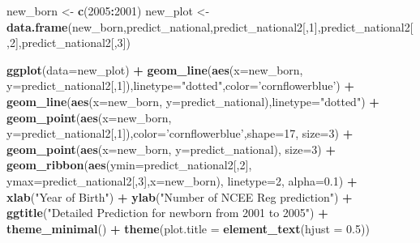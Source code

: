\documentclass[]{article}
\newenvironment{Shaded}{\begin{snugshade}}{\end{snugshade}}
\newcommand{\KeywordTok}[1]{\textcolor[rgb]{0.13,0.29,0.53}{\textbf{#1}}}
\newcommand{\DataTypeTok}[1]{\textcolor[rgb]{0.13,0.29,0.53}{#1}}
\newcommand{\DecValTok}[1]{\textcolor[rgb]{0.00,0.00,0.81}{#1}}
\newcommand{\FloatTok}[1]{\textcolor[rgb]{0.00,0.00,0.81}{#1}}
\newcommand{\StringTok}[1]{\textcolor[rgb]{0.31,0.60,0.02}{#1}}
\newcommand{\OperatorTok}[1]{\textcolor[rgb]{0.81,0.36,0.00}{\textbf{#1}}}
\newcommand{\NormalTok}[1]{#1}
\begin{document}
\begin{Shaded}
\begin{Highlighting}[]
\NormalTok{new_born <-}\StringTok{ }\KeywordTok{c}\NormalTok{(}\DecValTok{2005}\OperatorTok{:}\DecValTok{2001}\NormalTok{)}
\NormalTok{new_plot <-}\StringTok{ }\KeywordTok{data.frame}\NormalTok{(new_born,predict_national,predict_national2[,}\DecValTok{1}\NormalTok{],predict_national2[,}\DecValTok{2}\NormalTok{],predict_national2[,}\DecValTok{3}\NormalTok{])}

\KeywordTok{ggplot}\NormalTok{(}\DataTypeTok{data=}\NormalTok{new_plot) }\OperatorTok{+}
\StringTok{  }\KeywordTok{geom_line}\NormalTok{(}\KeywordTok{aes}\NormalTok{(}\DataTypeTok{x=}\NormalTok{new_born, }\DataTypeTok{y=}\NormalTok{predict_national2[,}\DecValTok{1}\NormalTok{]),}\DataTypeTok{linetype=}\StringTok{"dotted"}\NormalTok{,}\DataTypeTok{color=}\StringTok{'cornflowerblue'}\NormalTok{) }\OperatorTok{+}
\StringTok{  }\KeywordTok{geom_line}\NormalTok{(}\KeywordTok{aes}\NormalTok{(}\DataTypeTok{x=}\NormalTok{new_born, }\DataTypeTok{y=}\NormalTok{predict_national),}\DataTypeTok{linetype=}\StringTok{"dotted"}\NormalTok{) }\OperatorTok{+}
\StringTok{  }\KeywordTok{geom_point}\NormalTok{(}\KeywordTok{aes}\NormalTok{(}\DataTypeTok{x=}\NormalTok{new_born, }\DataTypeTok{y=}\NormalTok{predict_national2[,}\DecValTok{1}\NormalTok{]),}\DataTypeTok{color=}\StringTok{'cornflowerblue'}\NormalTok{,}\DataTypeTok{shape=}\DecValTok{17}\NormalTok{, }\DataTypeTok{size=}\DecValTok{3}\NormalTok{) }\OperatorTok{+}
\StringTok{  }\KeywordTok{geom_point}\NormalTok{(}\KeywordTok{aes}\NormalTok{(}\DataTypeTok{x=}\NormalTok{new_born, }\DataTypeTok{y=}\NormalTok{predict_national), }\DataTypeTok{size=}\DecValTok{3}\NormalTok{) }\OperatorTok{+}
\StringTok{  }\KeywordTok{geom_ribbon}\NormalTok{(}\KeywordTok{aes}\NormalTok{(}\DataTypeTok{ymin=}\NormalTok{predict_national2[,}\DecValTok{2}\NormalTok{], }\DataTypeTok{ymax=}\NormalTok{predict_national2[,}\DecValTok{3}\NormalTok{],}\DataTypeTok{x=}\NormalTok{new_born), }\DataTypeTok{linetype=}\DecValTok{2}\NormalTok{, }\DataTypeTok{alpha=}\FloatTok{0.1}\NormalTok{) }\OperatorTok{+}
\StringTok{    }\KeywordTok{xlab}\NormalTok{(}\StringTok{"Year of Birth"}\NormalTok{) }\OperatorTok{+}
\StringTok{    }\KeywordTok{ylab}\NormalTok{(}\StringTok{"Number of NCEE Reg prediction"}\NormalTok{) }\OperatorTok{+}
\StringTok{    }\KeywordTok{ggtitle}\NormalTok{(}\StringTok{"Detailed Prediction for newborn from 2001 to 2005"}\NormalTok{) }\OperatorTok{+}
\StringTok{    }\KeywordTok{theme_minimal}\NormalTok{() }\OperatorTok{+}
\StringTok{    }\KeywordTok{theme}\NormalTok{(}\DataTypeTok{plot.title =} \KeywordTok{element_text}\NormalTok{(}\DataTypeTok{hjust =} \FloatTok{0.5}\NormalTok{))}
\end{Highlighting}
\end{Shaded}
\end{document}
